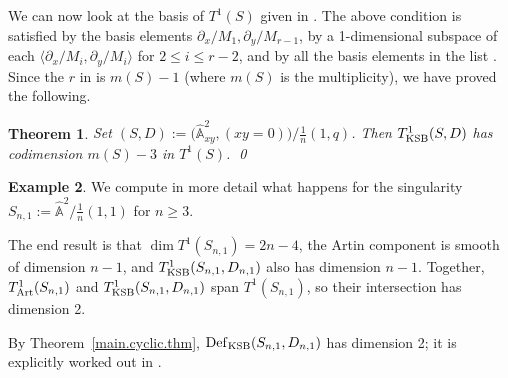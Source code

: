 \documentclass{amsart}
\newtheorem{thm}{Theorem}%
\theoremstyle{definition}
\newtheorem{exmp}[thm]{Example}
\theoremstyle{remark}
\renewcommand{\a}[0]{\hat{\mathbb A}}
\newcommand{\dx}[0]{\partial_x}
\newcommand{\dy}[0]{\partial_y}
\newcommand{\defsp}[0]{\operatorname{Def}}
\begin{document}
We can now look at the basis of  $T^1(S)$ given in \cite[6.73]{k-modbook}.
The above condition is satisfied by the basis elements $\dx/M_1, \dy/M_{r-1}$,
by a 1-dimensional subspace  of each  $\bigl\langle \dx/M_i, \dy/M_i\bigr\rangle$ for $2\leq i\leq r{-}2$, and by all the basis elements in  the list  \cite[6.73.2]{k-modbook}. Since the $r$ in \cite[6.73]{k-modbook} is $m(S)-1$ (where $m(S)$ is the multiplicity), we have proved the following.


\begin{thm}\label{KSB.codin.infini.thm}
  Set $(S, D):=\bigl(\a^2_{xy}, (xy=0)\bigr)/\tfrac1{n}(1,q)$. Then $T^1_{\rm KSB}(S, D)$ has codimension $m(S)-3$ in
  $T^1(S)$. \qed
  \end{thm}




\begin{exmp} We compute in more detail what happens for the singularity
  $S_{n,1}:=\a^2/\frac1{n}(1,1)$ for $n\geq 3$.

  The end result is that $\dim T^1(S_{n,1})=2n-4$, the Artin component is smooth
  of dimension $n-1$, and $T^1_{\rm KSB}(S_{n,1}, D_{n,1})$  also
has dimension $n-1$. Together, $T^1_{\rm Art}(S_{n,1})$ and $T^1_{\rm KSB}(S_{n,1}, D_{n,1})$
span $T^1(S_{n,1})$, so their intersection has dimension 2.

By Theorem~\ref{main.cyclic.thm}, $\defsp_{\rm KSB}(S_{n,1}, D_{n,1})$ has dimension 2; it is explicitly worked out  in   \cite[2.32]{k-modbook}.


\end{exmp}
\end{document}
